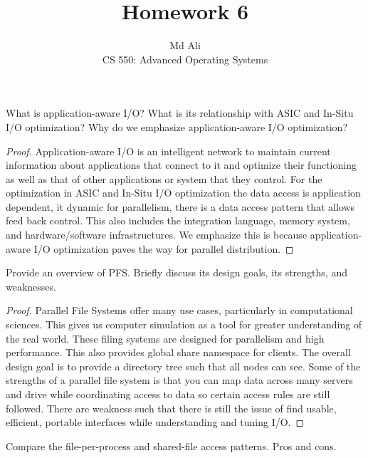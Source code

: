 \documentclass[12pt]{article}
\newenvironment{exercise}[2][Exercise]{\begin{trivlist}
\item[\hskip \labelsep {\bfseries #1}\hskip \labelsep {\bfseries #2.}]}{\end{trivlist}}
\begin{document}
 
\title{Homework 6}
\author{Md Ali\\ 
CS 550: Advanced Operating Systems}
\maketitle

\begin{exercise}{1}
What is application-aware I/O? What is its relationship with ASIC and In-Situ I/O optimization? Why do we emphasize application-aware I/O optimization?
\end{exercise} 

\begin{proof}
Application-aware I/O is an intelligent network to maintain current information about applications that connect to it and optimize their functioning as well as that of other applications or system that they control. For the optimization in ASIC and In-Situ I/O optimization the data access is application dependent, it dynamic for parallelism, there is a data access pattern that allows feed back control. This also includes the integration language, memory system, and hardware/software infrastructures. 
We emphasize this is because application-aware I/O optimization paves the way for parallel distribution. 
\end{proof}
 
\begin{exercise}{2}
Provide an overview of PFS. Briefly discuss its design goals, its strengths, and weaknesses. 
\end{exercise}
 
\begin{proof}
Parallel File Systems offer many use cases, particularly in computational sciences. This gives us computer simulation as a tool for greater understanding of the real world. These filing systems are designed for parallelism and high performance. This also provides global share namespace for clients. The overall design goal is to provide a directory tree such that all nodes can see. Some of the strengths of a parallel file system is that you can map data across many servers and drive while coordinating access to data so certain access rules are still followed. There are weakness such that there is still the issue of find usable, efficient, portable interfaces while understanding and tuning I/O. 
\end{proof}

\begin{exercise}{3}
Compare the file-per-process and shared-file access patterns. Pros and cons.
\end{exercise}
\end{document}
